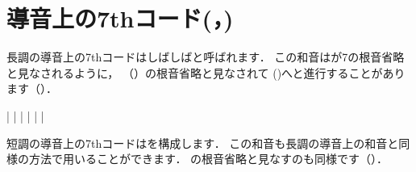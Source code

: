\documentclass[dvipdfmx,uplatex,b5paper,openany,jbase=12Q,nomag*,textwidth-limit=44%
               ]{gachimuchi}
\begin{document}
\section{導音上の7thコード(\texorpdfstring{\Gnvii\hDim{}，\Gnvii\Dim{}}{VII\o7，VIIdim7})}
長調の導音上の7thコードはしばしばと呼ばれます．
この和音は\Gnvii\Dim が\Gnv\subsc7の根音省略と見なされるように，
\Gnv{}（）の根音省略と見なされて
\Gni(\Min)へと進行することがあります（）．

\begin{Music}[0.5\linewidth]
  \Startpiece%
  \NOTEs%
  |%
  \en\bar%
  \NOTEs%
  |%
  \en\doublebar%
  \NOTEs%
  |%
  \en\bar%
  \NOTEs%
  |%
  \en\setdoublebar%
  \endpiece%
\end{Music}

短調の導音上の7thコードはを構成します．
この和音も長調の導音上の和音と同様の方法で用いることができます．
\Gnv{}の根音省略と見なすのも同様です（）．
\end{document}
